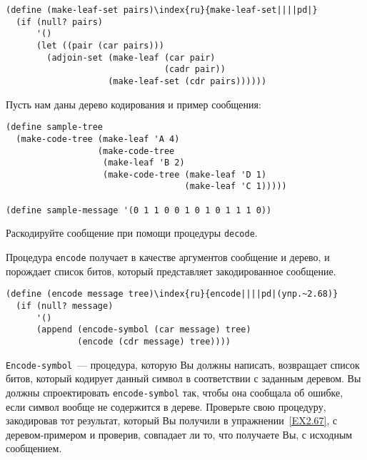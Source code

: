 \begin{Verbatim}[fontsize=\small]
(define (make-leaf-set pairs)\index{ru}{make-leaf-set||||pd|}
  (if (null? pairs)
      '()
      (let ((pair (car pairs)))
        (adjoin-set (make-leaf (car pair)
                               (cadr pair))
                    (make-leaf-set (cdr pairs))))))
\end{Verbatim}
\begin{exercise}{2.67}\label{EX2.67}%
Пусть нам даны дерево кодирования и пример сообщения:

\begin{Verbatim}[fontsize=\small]
(define sample-tree
  (make-code-tree (make-leaf 'A 4)
                  (make-code-tree
                   (make-leaf 'B 2)
                   (make-code-tree (make-leaf 'D 1)
                                   (make-leaf 'C 1)))))

(define sample-message '(0 1 1 0 0 1 0 1 0 1 1 1 0))
\end{Verbatim}
Раскодируйте сообщение при помощи процедуры {\tt decode}.
\end{exercise}
\begin{exercise}{2.68}\label{EX2.68}%
Процедура {\tt encode} получает в качестве
аргументов сообщение и дерево, и порождает список битов, который
представляет закодированное сообщение.

\begin{Verbatim}[fontsize=\small]
(define (encode message tree)\index{ru}{encode||||pd|(упр.~2.68)}
  (if (null? message)
      '()
      (append (encode-symbol (car message) tree)
              (encode (cdr message) tree))))
\end{Verbatim}
{\tt Encode-symbol}~--- процедура, которую Вы должны написать,
возвращает список битов, который кодирует данный символ в соответствии 
с заданным деревом.  Вы должны спроектировать
{\tt encode-symbol} так, чтобы она сообщала об ошибке, если
символ вообще не содержится в дереве.  Проверьте свою процедуру,
закодировав тот результат, который Вы получили в упражнении~\ref{EX2.67}, с деревом-примером и проверив,
совпадает ли то, что получаете Вы, с исходным сообщением.
\end{exercise}
